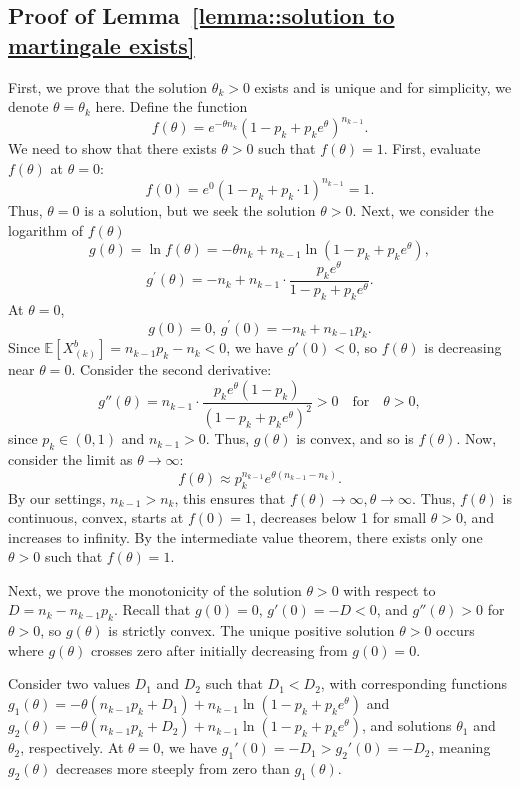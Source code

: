 \subsection{Proof of Lemma~\ref{lemma::solution to martingale exists}}\label{appendix_lemma::proof of solution to martingale exists}
First, we prove that the solution $\theta_k>0$ exists and is unique and for simplicity, we denote $\theta=\theta_k$ here. Define the function
\[
f(\theta) = e^{-\theta n_{k}} (1 - p_k + p_k e^{\theta})^{n_{k-1}}.
\]
We need to show that there exists \(\theta > 0\) such that \(f(\theta) = 1\). First, evaluate \(f(\theta)\) at \(\theta = 0\):
\[
f(0) = e^{0} (1 - p_k + p_k \cdot 1)^{n_{k-1}} = 1.
\]
Thus, \(\theta = 0\) is a solution, but we seek the solution \(\theta > 0\). Next, we consider the logarithm of $f(\theta)$
$$g(\theta) = \ln f(\theta) = -\theta n_{k} + n_{k-1} \ln(1 - p_k + p_k e^{\theta}),$$
$$ g^\prime(\theta) = -n_{k} + n_{k-1} \cdot \frac{p_k e^{\theta}}{1 - p_k + p_k e^{\theta}}.$$
At \(\theta = 0\),
\[
g(0)=0,\,g^\prime(0) = -n_{k} + n_{k-1} p_k.
\]
Since \(\mathbb{E}[X^b_{(k)}] = n_{k-1} p_k - n_{k} < 0\), we have \(g'(0) < 0\), so \(f(\theta)\) is decreasing near \(\theta = 0\). Consider the second derivative:
\[
g''(\theta) = n_{k-1} \cdot \frac{p_k e^{\theta} (1 - p_k)}{(1 - p_k + p_k e^{\theta})^2} > 0 \quad \text{for} \quad \theta > 0,
\]
since \(p_k \in (0, 1)\) and \(n_{k-1} > 0\). Thus, \(g(\theta)\) is convex, and so is \(f(\theta)\). Now, consider the limit as \(\theta \to \infty\):
\[
f(\theta) \approx p_k^{n_{k-1}} e^{\theta (n_{k-1} - n_{k})}.
\]
By our settings, $n_{k-1}>n_k$, this ensures that $f(\theta)\to \infty, \theta\to \infty$. Thus, \(f(\theta)\) is continuous, convex, starts at \(f(0) = 1\), decreases below 1 for small \(\theta > 0\), and increases to infinity. By the intermediate value theorem, there exists only one \(\theta > 0\) such that \(f(\theta) = 1\). 

Next, we prove the monotonicity of the solution $\theta>0$ with respect to \(D = n_k - n_{k-1} p_k\). Recall that \(g(0) = 0\), \(g'(0) = -D < 0\), and \(g''(\theta) > 0\) for \(\theta > 0\), so \(g(\theta)\) is strictly convex. The unique positive solution \(\theta > 0\) occurs where \(g(\theta)\) crosses zero after initially decreasing from \(g(0) = 0\).

Consider two values \(D_1\) and \(D_2\) such that \(D_1 < D_2\), with corresponding functions \(g_1(\theta) = -\theta (n_{k-1} p_k + D_1) + n_{k-1} \ln(1 - p_k + p_k e^{\theta})\) and \(g_2(\theta) = -\theta (n_{k-1} p_k + D_2) + n_{k-1} \ln(1 - p_k + p_k e^{\theta})\), and solutions \(\theta_1\) and \(\theta_2\), respectively. At \(\theta = 0\), we have \(g_1'(0) = -D_1 > g_2'(0) = -D_2\), meaning \(g_2(\theta)\) decreases more steeply from zero than \(g_1(\theta)\).

